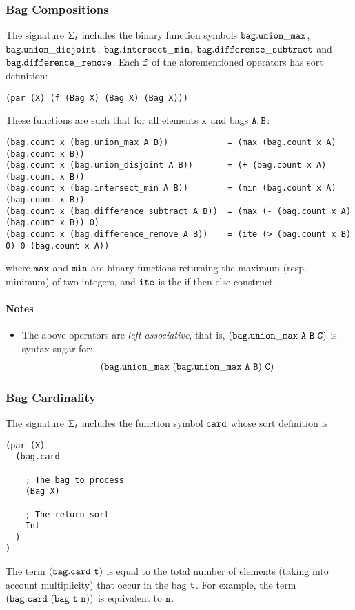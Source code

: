 \documentclass[english,a4paper,10pt]{article}
\begin{document}
\subsubsection{Bag Compositions}
\label{sec:bag-compositions}
The signature $\Sigma_{t}$ includes 
the binary function symbols 
${\tt bag.union\_max}$, ${\tt bag.union\_disjoint}$, 
${\tt bag.intersect\_min}$, ${\tt bag.difference\_subtract}$ and
${\tt bag.difference\_remove}$.
Each ${\tt f}$ of the aforementioned operators
has sort definition:
\begin{verbatim}
(par (X) (f (Bag X) (Bag X) (Bag X)))
\end{verbatim}
These functions are such that for all elements ${\tt x}$
and bags ${\tt A,B}$:
\begin{verbatim}
(bag.count x (bag.union_max A B))            = (max (bag.count x A) (bag.count x B))
(bag.count x (bag.union_disjoint A B))       = (+ (bag.count x A) (bag.count x B))
(bag.count x (bag.intersect_min A B))        = (min (bag.count x A) (bag.count x B))
(bag.count x (bag.difference_subtract A B))  = (max (- (bag.count x A) (bag.count x B)) 0)
(bag.count x (bag.difference_remove A B))    = (ite (> (bag.count x B) 0) 0 (bag.count x A))
\end{verbatim}
where ${\tt max}$ and ${\tt min}$ are binary functions
returning the maximum (resp. minimum) of two integers, and ${\tt ite}$
is the if-then-else construct.

\paragraph{Notes}
\begin{itemize}
\item
The above operators are \emph{left-associative}, that is,
${\tt (bag.union\_max\ A\ B\ C)}$ is syntax sugar for:
\begin{align*}
{\tt (bag.union\_max\ (bag.union\_max\ A\ B)\ C)}
\end{align*}
\end{itemize}

\subsubsection{Bag Cardinality}
The signature $\Sigma_{t}$ includes 
the function symbol ${\tt card}$ whose sort definition is
\begin{verbatim}
(par (X) 
  (bag.card 
  
    ; The bag to process
    (Bag X) 
    
    ; The return sort
    Int
  )
)
\end{verbatim}
The term ${\tt (bag.card\ t)}$ is equal to
the total number of elements (taking into account multiplicity)
that occur in the bag ${\tt t}$.
For example, the term $\syntax{(bag.card\ (bag\ t\ n))}$ is
equivalent to ${\tt n}$.
\end{document}
